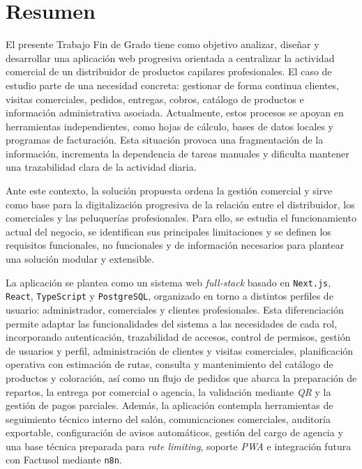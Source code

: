 \newpage{\ } 
\thispagestyle{empty}
\chapter*{Resumen}

El presente Trabajo Fin de Grado tiene como objetivo analizar, diseñar y desarrollar una aplicación web progresiva orientada a centralizar la actividad comercial de un distribuidor de productos capilares profesionales. El caso de estudio parte de una necesidad concreta: gestionar de forma continua clientes, visitas comerciales, pedidos, entregas, cobros, catálogo de productos e información administrativa asociada. Actualmente, estos procesos se apoyan en herramientas independientes, como hojas de cálculo, bases de datos locales y programas de facturación. Esta situación provoca una fragmentación de la información, incrementa la dependencia de tareas manuales y dificulta mantener una trazabilidad clara de la actividad diaria.

Ante este contexto, la solución propuesta ordena la gestión comercial y sirve como base para la digitalización progresiva de la relación entre el distribuidor, los comerciales y las peluquerías profesionales. Para ello, se estudia el funcionamiento actual del negocio, se identifican sus principales limitaciones y se definen los requisitos funcionales, no funcionales y de información necesarios para plantear una solución modular y extensible.

La aplicación se plantea como un sistema web \textit{full-stack} basado en \texttt{Next.js}, \texttt{React}, \texttt{TypeScript} y \texttt{PostgreSQL}, organizado en torno a distintos perfiles de usuario: administrador, comerciales y clientes profesionales. Esta diferenciación permite adaptar las funcionalidades del sistema a las necesidades de cada rol, incorporando autenticación, trazabilidad de accesos, control de permisos, gestión de usuarios y perfil, administración de clientes y visitas comerciales, planificación operativa con estimación de rutas, consulta y mantenimiento del catálogo de productos y coloración, así como un flujo de pedidos que abarca la preparación de repartos, la entrega por comercial o agencia, la validación mediante \textit{QR} y la gestión de pagos parciales. Además, la aplicación contempla herramientas de seguimiento técnico interno del salón, comunicaciones comerciales, auditoría exportable, configuración de avisos automáticos, gestión del cargo de agencia y una base técnica preparada para \textit{rate limiting}, soporte \textit{PWA} e integración futura con Factusol mediante \texttt{n8n}.

